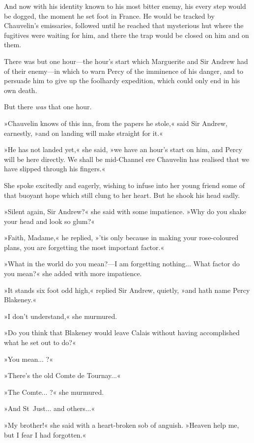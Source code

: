 And now with his identity known to his most bitter enemy, his every step would be dogged, the moment he set foot in France. He would be tracked by Chauvelin's emissaries, followed until he reached that mysterious hut where the fugitives were waiting for him, and there the trap would be closed on him and on them.

There was but one hour\allowbreak---\allowbreak the hour's start which Marguerite and Sir Andrew had of their enemy\allowbreak---\allowbreak in which to warn Percy of the imminence of his danger, and to persuade him to give up the foolhardy expedition, which could only end in his own death.

But there \textit{was} that one hour.

»Chauvelin knows of this inn, from the papers he stole,« said Sir Andrew, earnestly, »and on landing will make straight for it.«

»He has not landed yet,« she said, »we have an hour's start on him, and Percy will be here directly. We shall be mid-Channel ere Chauvelin has realised that we have slipped through his fingers.«

She spoke excitedly and eagerly, wishing to infuse into her young friend some of that buoyant hope which still clung to her heart. But he shook his head sadly.

»Silent again, Sir Andrew?« she said with some impatience. »Why do you shake your head and look so glum?«

»Faith, Madame,« he replied, »'tis only because in making your rose-coloured plans, you are forgetting the most important factor.«

»What in the world do you mean?\allowbreak---\allowbreak I am forgetting nothing... What factor do you mean?« she added with more impatience.

»It stands six foot odd high,« replied Sir Andrew, quietly, »and hath name Percy Blakeney.«

»I don't understand,« she murmured.

»Do you think that Blakeney would leave Calais without having accomplished what he set out to do?«

»You mean... ?«

»There's the old Comte de Tournay...«

»The Comte... ?« she murmured.

»And St~Just... and others...«

»My brother!« she said with a heart-broken sob of anguish. »Heaven help me, but I fear I had forgotten.«

